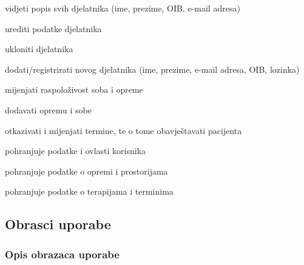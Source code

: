 \begin{packed_enum}
\begin{packed_enum}
				\end{packed_enum}
				\item  {}
				\begin{packed_enum}
					
					\item vidjeti popis svih djelatnika (ime, prezime, OIB, e-mail adresa)
					\item urediti podatke djelatnika
					\item ukloniti djelatnika
					\item dodati/registrirati novog djelatnika (ime, prezime, e-mail adresa, OIB, lozinka)
					\item mijenjati raspoloživost soba i opreme
					\item dodavati opremu i sobe
					\item otkazivati i mijenjati termine, te o tome obavještavati pacijenta
					
				\end{packed_enum}
				
				\item  {}
				\begin{packed_enum}
					
					\item pohranjuje podatke i ovlasti korisnika
					\item pohranjuje podatke o opremi i prostorijama
					\item pohranjuje podatke o terapijama i terminima
					
				\end{packed_enum}
			\end{packed_enum}
			
			\eject 
			
			
				
			\subsection{Obrasci uporabe}
				
				
				\subsubsection{Opis obrazaca uporabe}
					


